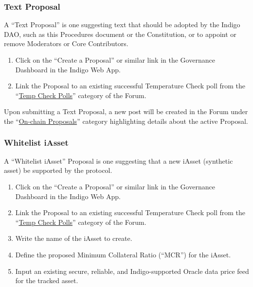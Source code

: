 \hypertarget{text-proposal}{%
\subsubsection{Text Proposal}\label{text-proposal}}

A ``Text Proposal'' is one suggesting text that should be adopted by the
Indigo DAO, such as this Procedures document or the Constitution, or to
appoint or remove Moderators or Core Contributors.

\begin{enumerate}
\item
  Click on the ``Create a Proposal'' or similar link in the Governance
  Dashboard in the Indigo Web App.
\item
  Link the Proposal to an existing successful Temperature Check poll
  from the ``\href{https://forum.indigoprotocol.io/c/polls/11}{Temp
  Check Polls}'' category of the Forum.
\end{enumerate}

Upon submitting a Text Proposal, a new post will be created in the Forum
under the
``\href{https://forum.indigoprotocol.io/c/proposals/6}{On-chain
Proposals}'' category highlighting details about the active Proposal.

\hypertarget{whitelist-iasset}{%
\subsubsection{Whitelist iAsset}\label{whitelist-iasset}}

A ``Whitelist iAsset'' Proposal is one suggesting that a new iAsset
(synthetic asset) be supported by the protocol.

\begin{enumerate}
\item
  Click on the ``Create a Proposal'' or similar link in the Governance
  Dashboard in the Indigo Web App.
\item
  Link the Proposal to an existing successful Temperature Check poll
  from the ``\href{https://forum.indigoprotocol.io/c/polls/11}{Temp
  Check Polls}'' category of the Forum.
\item
  Write the name of the iAsset to create.
\item
  Define the proposed Minimum Collateral Ratio (``MCR'') for the iAsset.
\item
  Input an existing secure, reliable, and Indigo-supported Oracle data
  price feed for the tracked asset.
\end{enumerate}

